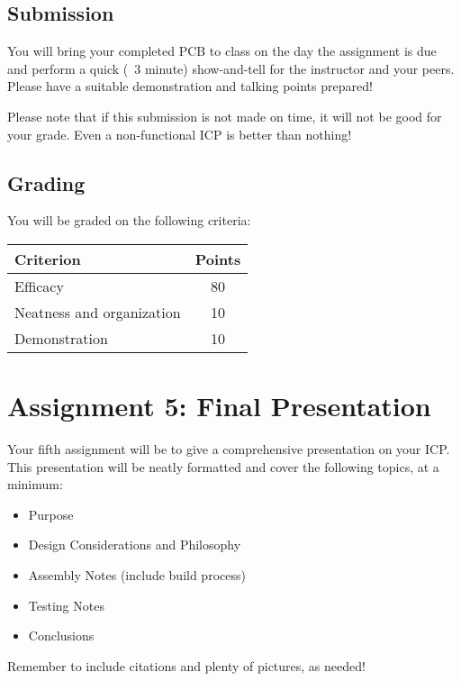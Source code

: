     \subsection*{Submission}
    You will bring your completed PCB to class on the day the assignment is due and perform a quick (~3 minute) show-and-tell for the instructor and your peers.
    Please have a suitable demonstration and talking points prepared!

    Please note that if this submission is not made on time, it will not be good for your grade.
    Even a non-functional ICP is better than nothing!

    \subsection*{Grading}
    You will be graded on the following criteria:

    \begin{table}[h!]
        \begin{tabular}{l | c}
            \toprule
            Criterion & Points \\
            \midrule
            Efficacy & 80 \\
            Neatness and organization & 10 \\
            Demonstration & 10 \\
            \bottomrule
        \end{tabular}
    \end{table}

\section*{Assignment 5: Final Presentation}
Your fifth assignment will be to give a comprehensive presentation on your ICP.
This presentation will be neatly formatted and cover the following topics, at a minimum:
    
    \begin{itemize}
        \item Purpose
        \item Design Considerations and Philosophy
        \item Assembly Notes (include build process)
        \item Testing Notes
        \item Conclusions
    \end{itemize}
    
    Remember to include citations and plenty of pictures, as needed!
        
